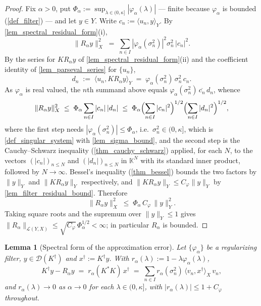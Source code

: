\documentclass[a4paper]{report}
\theoremstyle{plain}
\newtheorem{lemma}[theorem]{Lemma}
\theoremstyle{definition}
\theoremstyle{remark}
\newcommand{\Ll}{\mathcal{L}}
\newcommand{\Dom}{\mathcal{D}}
\newcommand{\dg}{^{\dagger}}
\begin{document}
\begin{proof}
  Fix $\alpha > 0$, put $\Phi_{\alpha} := \sup_{\lambda \in (0,\kappa]}|\varphi_{\alpha}
  (\lambda)|$ --- finite because $\varphi_{\alpha}$ is bounded (\cref{def_filter}) ---
  and let $y \in Y$.  Write $c_n := \langle u_n, y\rangle_Y$.  By
  \cref{lem_spectral_residual_form}(i),
  \[
    \|R_{\alpha}y\|_X^{2} \;=\; \sum_{n \in I} |\varphi_{\alpha}(\sigma_n^{2})|^{2}
      \sigma_n^{2}\,|c_n|^{2} .
  \]
  By the series for $KR_{\alpha}y$ of \cref{lem_spectral_residual_form}(ii) and the
  coefficient identity of \cref{lem_parseval_series} for $\{u_n\}$,
  \[
    d_n \;:=\; \langle u_n, KR_{\alpha}y\rangle_Y \;=\;
      \varphi_{\alpha}(\sigma_n^{2})\,\sigma_n^{2}\,c_n .
  \]
  As $\varphi_{\alpha}$ is real valued, the $n$th summand above equals
  $\varphi_{\alpha}(\sigma_n^{2})\,\overline{c_n}\,d_n$, whence
  \[
    \|R_{\alpha}y\|_X^{2} \;\le\; \Phi_{\alpha} \sum_{n \in I} |c_n|\,|d_n|
      \;\le\; \Phi_{\alpha}\Bigl(\sum_{n \in I}|c_n|^{2}\Bigr)^{1/2}
        \Bigl(\sum_{n \in I}|d_n|^{2}\Bigr)^{1/2},
  \]
  where the first step needs $|\varphi_{\alpha}(\sigma_n^{2})| \le \Phi_{\alpha}$, i.e.\
  $\sigma_n^{2} \in (0,\kappa]$, which is \cref{def_singular_system} with
  \cref{lem_sigma_bound}, and the second step is the Cauchy--Schwarz inequality
  (\cref{thm_cauchy_schwarz})
  applied, for each $N$, to the vectors $(|c_n|)_{n \le N}$ and $(|d_n|)_{n \le N}$ in
  $\mathbb{K}^{N}$ with its standard inner product, followed by $N \to \infty$.  Bessel's
  inequality (\cref{thm_bessel}) bounds the two factors by $\|y\|_Y$ and
  $\|KR_{\alpha}y\|_Y$ respectively, and $\|KR_{\alpha}y\|_Y \le C_{\varphi}\|y\|_Y$ by
  \cref{lem_filter_residual_bound}.  Therefore
  \[
    \|R_{\alpha}y\|_X^{2} \;\le\; \Phi_{\alpha}\,C_{\varphi}\,\|y\|_Y^{2} .
  \]
  Taking square roots and the supremum over $\|y\|_Y \le 1$ gives
  $\|R_{\alpha}\|_{\Ll(Y,X)} \le \sqrt{C_{\varphi}}\,\Phi_{\alpha}^{1/2} < \infty$;
  in particular $R_{\alpha}$ is bounded.
\end{proof}




\begin{lemma}[Spectral form of the approximation error]
  \label{lem_approx_error_spectral}
  Let $\{\varphi_{\alpha}\}$ be a regularizing filter, $y \in \Dom(K\dg)$ and
  $x\dg := K\dg y$.  With $r_{\alpha}(\lambda) := 1 - \lambda\varphi_{\alpha}(\lambda)$,
  \[
    K\dg y - R_{\alpha}y \;=\; r_{\alpha}(K^{*}K)\,x\dg
      \;=\; \sum_{n \in I} r_{\alpha}(\sigma_n^{2})\,\langle v_n, x\dg\rangle_X\, v_n ,
  \]
  and $r_{\alpha}(\lambda) \to 0$ as $\alpha \to 0$ for each $\lambda \in (0,\kappa]$,
  with $|r_{\alpha}(\lambda)| \le 1 + C_{\varphi}$ throughout.
\end{lemma}
\end{document}

